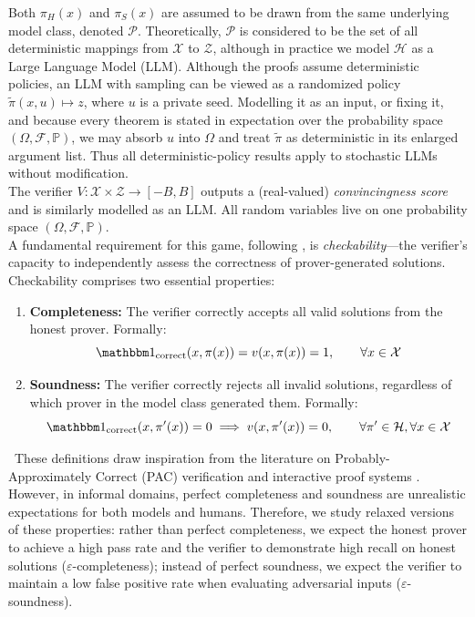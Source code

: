 Both $\pi_H(x)$ and $\pi_S(x)$ are assumed to be drawn from the same underlying model class, denoted $\mathcal{P}$. Theoretically, $\mathcal{P}$ is considered to be the set of all deterministic mappings from $\mathcal{X}$ to $\mathcal{Z}$, although in practice we model $\mathcal{H}$ as a Large Language Model (LLM). Although the proofs assume deterministic policies, an LLM with sampling can be viewed as a randomized policy $\tilde{\pi}(x, u) \mapsto z$, where $u$ is a private seed. Modelling it as an input, or fixing it, and because every theorem is stated in expectation over the probability space $(\Omega,\mathcal F,\mathbb P)$, we may absorb $u$ into $\Omega$ and treat $\tilde{\pi}$ as deterministic in its enlarged argument list. Thus all deterministic-policy results apply to stochastic LLMs without modification.
\\
The verifier $V:\mathcal{X}\times\mathcal{Z}\to[-B,B]$ outputs a
(real-valued) \emph{convincingness score} and is similarly modelled as an LLM.  All random variables live on one probability space $(\Omega,\mathcal F,\mathbb P)$.
\\
A fundamental requirement for this game, following \citet{kirchner2024prover}, is \emph{checkability}—the verifier's capacity to independently assess the correctness of prover-generated solutions. Checkability comprises two essential properties:

\begin{enumerate}
    \item \textbf{Completeness:} The verifier correctly accepts all valid solutions from the honest prover. Formally:
 $$\corr(x, \pi(x)) = v(x, \pi(x)) = 1, \qquad \forall x \in \mathcal{X}$$
    
    \item \textbf{Soundness:} The verifier correctly rejects all invalid solutions, regardless of which prover in the model class generated them. Formally:
$$\corr(x, \pi'(x)) = 0 \implies v(x, \pi'(x)) = 0, \qquad \forall \pi' \in \mathcal{H}, \forall x \in \mathcal{X}$$
\end{enumerate}
\noindent~These definitions draw inspiration from the literature on Probably-Approximately Correct (PAC) verification and interactive proof systems \citep{goldwasser2021interactive, pmlr-v195-mutreja23a}. However, in informal domains, perfect completeness and soundness are unrealistic expectations for both models and humans. Therefore, we study relaxed versions of these properties: rather than perfect completeness, we expect the honest prover to achieve a high pass rate and the verifier to demonstrate high recall on honest solutions ($\varepsilon$-completeness); instead of perfect soundness, we expect the verifier to maintain a low false positive rate when evaluating adversarial inputs ($\varepsilon$-soundness).

